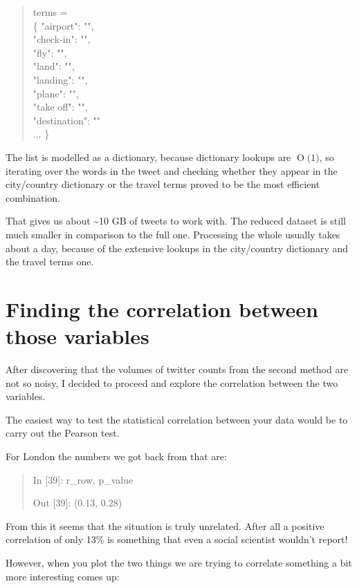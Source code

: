 \documentclass[minf,frontabs,twoside,singlespacing,parskip]{infthesis} %
\newcommand{\BigO}[1]{\ensuremath{\operatorname{O}\bigl(#1\bigr)}}
\begin{document}
\begin{quotation}
terms = \\
\{ "airport": "", \\
"check-in": "", \\
"fly": "", \\
"land": "", \\ 
"landing": "", \\
"plane": "", \\ 
"take off": "", \\
"destination": "" \\
... \}
\end{quotation}

The list is modelled as a dictionary, because dictionary lookups are \BigO{1}, so iterating over the words in the tweet and checking whether they appear in the city/country dictionary or the travel terms proved to be the most efficient combination.

That gives us about  \textasciitilde  10 GB of tweets to work with. The reduced dataset is still much smaller in comparison to the full one. Processing the whole usually takes about a day, because of the extensive lookups in the city/country dictionary and the travel terms one.

\section{Finding the correlation between those variables}

After discovering that the volumes of twitter counts from the second method are not so noisy, I decided to proceed and explore the correlation between the two variables.

The easiest way to test the statistical correlation between your data would be to carry out the Pearson test.

For London the numbers we got back from that are:
\begin{quotation}
In [39]: r\_row, p\_value

Out [39]: (0.13, 0.28)
\end{quotation}

From this it seems that the situation is truly unrelated. After all a positive correlation of only 13\% is something that even a social scientist wouldn't report!

However, when you plot the two things we are trying to correlate something a bit more interesting comes up:
\end{document}
